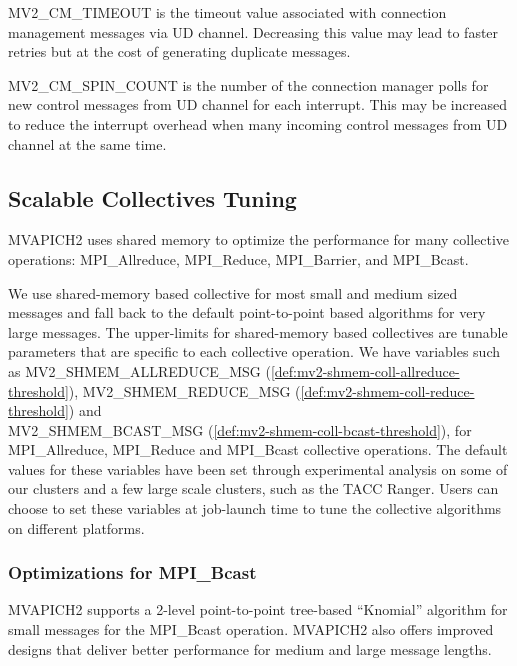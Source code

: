 MV2\_CM\_TIMEOUT is the timeout value associated with connection
management messages via UD channel. Decreasing this value may lead
to faster retries but at the cost of generating duplicate messages.

MV2\_CM\_SPIN\_COUNT is the number of the connection manager
polls for new control messages from UD channel for each interrupt.
This may be increased to reduce the interrupt overhead when many
incoming control messages from UD channel at the same time.

\subsection{Scalable Collectives Tuning}

MVAPICH2 uses shared memory to optimize the performance for many
collective operations: MPI\_Allreduce, MPI\_Reduce, MPI\_Barrier,
and MPI\_Bcast. 

We use shared-memory based collective for most small
and medium sized messages and fall back to the default point-to-point based
algorithms for very large messages. The upper-limits for shared-memory based 
collectives are tunable parameters that are specific to each collective 
operation. We have variables such as MV2\_SHMEM\_ALLREDUCE\_MSG (\ref{def:mv2-shmem-coll-allreduce-threshold}), 
MV2\_SHMEM\_REDUCE\_MSG (\ref{def:mv2-shmem-coll-reduce-threshold}) and  \\
MV2\_SHMEM\_BCAST\_MSG (\ref{def:mv2-shmem-coll-bcast-threshold}), for 
MPI\_Allreduce, MPI\_Reduce and MPI\_Bcast collective operations. The default
values for these variables have been set through experimental analysis on 
some of our clusters and a few large scale clusters, such as the TACC Ranger. 
Users can choose to set these variables at job-launch time to tune the collective algorithms
on different platforms. 

\subsubsection{Optimizations for MPI\_Bcast}
 MVAPICH2 supports a 2-level point-to-point tree-based
 ``Knomial'' algorithm for small messages for the MPI\_Bcast operation. MVAPICH2 also 
offers improved designs that deliver better performance for medium and large message lengths. 


